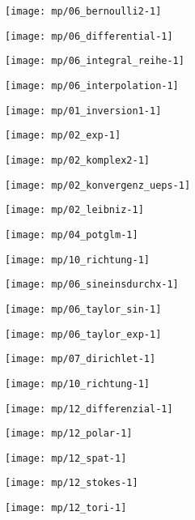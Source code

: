 \texttt{[image: mp/06\_bernoulli2-1]}

\texttt{[image: mp/06\_differential-1]}

\texttt{[image: mp/06\_integral\_reihe-1]}

\texttt{[image: mp/06\_interpolation-1]}

\texttt{[image: mp/01\_inversion1-1]}

\texttt{[image: mp/02\_exp-1]}

\texttt{[image: mp/02\_komplex2-1]}

\texttt{[image: mp/02\_konvergenz\_ueps-1]}

\texttt{[image: mp/02\_leibniz-1]}

\texttt{[image: mp/04\_potglm-1]}

\texttt{[image: mp/10\_richtung-1]}

\texttt{[image: mp/06\_sineinsdurchx-1]}

\texttt{[image: mp/06\_taylor\_sin-1]}

\texttt{[image: mp/06\_taylor\_exp-1]}

\texttt{[image: mp/07\_dirichlet-1]}

\texttt{[image: mp/10\_richtung-1]}

\texttt{[image: mp/12\_differenzial-1]}

\texttt{[image: mp/12\_polar-1]}

\texttt{[image: mp/12\_spat-1]}

\texttt{[image: mp/12\_stokes-1]}

\texttt{[image: mp/12\_tori-1]}

